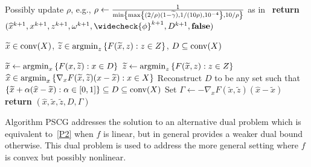 \begin{algorithm}[H]
\begin{algorithmic}[1]
        \EndIf
        \State Possibly update $\rho$, e.g., $\rho \gets \frac{1}{\min \left\{ \max \left\{ (2/\rho)(1-\widetilde{\gamma}),1/(10\rho),10^{-4} \right \}, 10/\rho \right \}}$ as in~\cite{Kiwiel1995} \label{Alg4RhoUpdate}
        \EndFor  
      \State \textbf{return}  $(\widehat{x}^{k+1},x^{k+1},z^{k+1},\omega^{k+1},\widecheck{\phi}^{k+1}, D^{k+1}, \textbf{false})$
\EndFunction
\end{algorithmic}
\medskip
\begin{algorithmic}
 $\widetilde{x} \in \operatorname{conv}(X)$, $\widetilde{z} \in \operatorname*{argmin}_z \left\{ F(\widetilde{x},z) : z \in Z \right \}$, $D \subseteq \operatorname{conv}(X)$
\end{algorithmic}
\begin{algorithmic}[1]
         \label{ForXYUpdateBegin}
           \State $\widetilde{x} \gets \operatorname*{argmin}_x \left\{ F(x,\widetilde{z}) : x \in D \right \}$ \label{SDMGSXUpdate}
	\State $\widetilde{z} \gets \operatorname*{argmin}_z \left\{ F(\widetilde{x},z) : z \in Z \right \}$ \label{SDMGSZUpdate}
        \EndFor \label{ForXYUpdateEnd}
	\State $\widehat{x} \in \operatorname*{argmin}_x \left\{ \nabla_x F(\widetilde{x},\widetilde{z}) (x - \widetilde{x}) : x \in X \right \}$ \label{SCGDirFindingSP}
	 \State Reconstruct ${D}$ to be any set such that \label{LineDa}
	 \State \quad $\left\{ \widetilde{x} + \alpha (\widehat{x} - \widetilde{x}) : \alpha \in [0,1] \right \} \subseteq {D} \subseteq \operatorname{conv}(X)$ \label{LineDb}
	 \State Set $\Gamma \gets - \nabla_x F(\widetilde{x},\widetilde{z}) (\widehat{x} - \widetilde{x})$ \label{GammaLine}
      \State \textbf{return} $\left(\widehat{x},\widetilde{x},\widetilde{z},{D}, \Gamma \right)$ 
\EndFunction
\end{algorithmic}
\end{algorithm} 



Algorithm PSCG addresses the solution to an alternative dual problem which is equivalent to~\eqref{P2} when $f$ is linear, but in general provides a weaker dual bound otherwise. This dual problem is used to address the more general setting where $f$ is convex but possibly nonlinear.%




